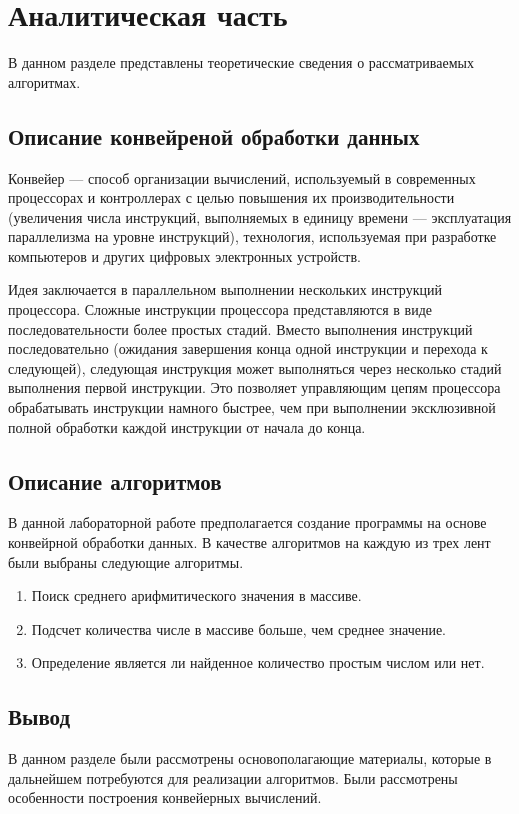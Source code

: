 \chapter{Аналитическая часть}
В данном разделе представлены теоретические сведения о рассматриваемых алгоритмах.

\section{Описание конвейреной обработки данных}
Конвейер \cite{konveer}— способ организации вычислений, используемый в современных процессорах и контроллерах с целью повышения их производительности (увеличения числа инструкций, выполняемых в единицу времени — эксплуатация параллелизма на уровне инструкций), технология, используемая при разработке компьютеров и других цифровых электронных устройств.

Идея заключается в параллельном выполнении нескольких инструкций процессора. Сложные инструкции процессора представляются в виде последовательности более простых стадий. Вместо выполнения инструкций последовательно (ожидания завершения конца одной инструкции и перехода к следующей), следующая инструкция может выполняться через несколько стадий выполнения первой инструкции. Это позволяет управляющим цепям процессора обрабатывать инструкции намного быстрее, чем при выполнении эксклюзивной полной обработки каждой инструкции от начала до конца.

\section{Описание алгоритмов}
В данной лабораторной работе предполагается создание программы на основе конвейрной обработки данных. В качестве алгоритмов на каждую из трех лент были выбраны следующие алгоритмы.
\begin{enumerate}
	\item Поиск среднего арифмитического значения в массиве.
	\item Подсчет количества числе в массиве больше, чем среднее значение.
	\item Определение является ли найденное количество простым числом или нет.
\end{enumerate}


\section{Вывод}
В данном разделе были рассмотрены основополагающие материалы, которые в дальнейшем потребуются для реализации алгоритмов. Были рассмотрены особенности построения конвейерных вычислений.

